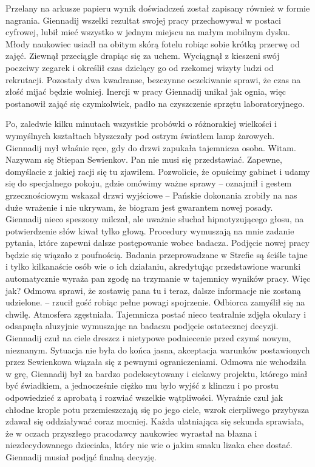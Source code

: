 \documentclass[../MAIN.tex]{subfiles}
\begin{document}
Przelany na arkusze papieru wynik doświadczeń został zapisany również w formie nagrania. Giennadij wszelki rezultat swojej pracy przechowywał w postaci cyfrowej, lubił mieć wszystko w jednym miejscu na małym mobilnym dysku. Młody naukowiec usiadł na obitym skórą fotelu robiąc sobie krótką przerwę od zajęć. Ziewnął przeciągle drapiąc się za uchem. Wyciągnął z kieszeni swój poczciwy zegarek i określił czas dzielący go od rzekomej wizyty ludzi od rekrutacji. Pozostały dwa kwadranse, bezczynne oczekiwanie sprawi, że czas na złość mijać będzie wolniej. Inercji w pracy Giennadij unikał jak ognia, więc postanowił zająć się czymkolwiek, padło na czyszczenie sprzętu laboratoryjnego. 

Po, zaledwie kilku minutach wszystkie probówki o różnorakiej wielkości i wymyślnych kształtach błyszczały pod ostrym światłem lamp żarowych. Giennadij mył właśnie ręce, gdy do drzwi zapukała tajemnicza osoba. 
\sx
Witam. Nazywam się Stiepan Sewienkov. Pan nie musi się przedstawiać. Zapewne, domyślacie z jakiej racji się tu zjawiłem. Pozwolicie, że opuścimy gabinet i udamy się do specjalnego pokoju, gdzie omówimy ważne sprawy -- oznajmił i gestem grzecznościowym wskazał drzwi wyjściowe -- Pańskie dokonania zrobiły na nas duże wrażenie i nie ukrywam, że biogram jest gwarantem nowej posady.
\qd
Giennadij nieco speszony milczał, ale uważnie słuchał hipnotyzującego głosu, na potwierdzenie słów kiwał tylko głową. 
\sx Procedury wymuszają na mnie zadanie pytania, które zapewni dalsze postępowanie wobec badacza. Podjęcie nowej pracy będzie się wiązało z poufnością. Badania przeprowadzane w Strefie są ściśle tajne i tylko kilkanaście osób wie o ich działaniu, akredytując przedstawione warunki automatycznie wyraża pan zgodę na trzymanie w tajemnicy wyników pracy. Więc jak? Odmowa sprawi, że zostawię pana tu i teraz, dalsze informacje nie zostaną udzielone. -- rzucił gość robiąc pełne powagi spojrzenie.
\qd
Odbiorca zamyślił się na chwilę. Atmosfera zgęstniała. Tajemnicza postać nieco teatralnie zdjęła okulary i odsapnęła aluzyjnie wymuszając na badaczu podjęcie ostatecznej decyzji. Giennadij czuł na ciele dreszcz i nietypowe podniecenie przed czymś nowym, nieznanym. Sytuacja nie była do końca jasna, akceptacja warunków postawionych przez Sewienkowa wiązała się z pewnymi ograniczeniami. Odmowa nie wchodziła w grę, Giennadij był za bardzo podekscytowany i ciekawy projektu, którego miał być świadkiem, a jednocześnie ciężko mu było wyjść z klinczu i po prostu odpowiedzieć z aprobatą i rozwiać wszelkie wątpliwości. Wyraźnie czuł jak chłodne krople potu przemieszczają się po jego ciele, wzrok cierpliwego przybysza zdawał się oddziaływać coraz mocniej. Każda ulatniająca się sekunda sprawiała, że w oczach przyszłego pracodawcy naukowiec wyrastał na błazna i niezdecydowanego dzieciaka, który nie wie o jakim smaku lizaka chce dostać. Giennadij musiał podjąć finalną decyzję. 
\end{document}
